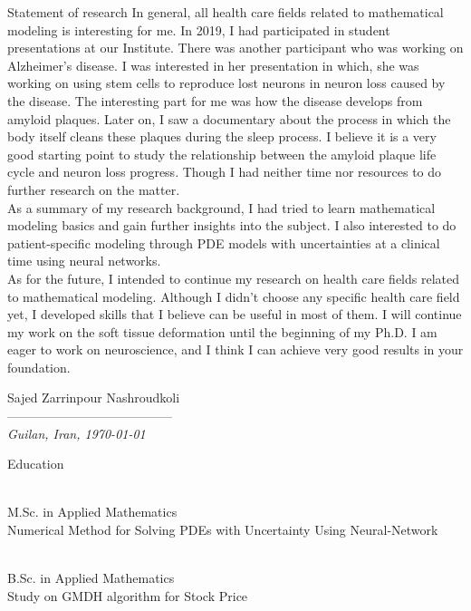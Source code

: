 \documentclass{resume} %
\begin{document}
\begin{cSection}{Statement of research}
	In general, all health care fields related to mathematical modeling is interesting for me. In 2019, I had participated in student presentations at our Institute. There was another participant who was working on Alzheimer's disease. I was interested in her presentation in which, she was working on using stem cells to reproduce lost neurons in neuron loss caused by the disease. The interesting part for me was how the disease develops from amyloid plaques. Later on, I saw a documentary about the process in which the body itself cleans these plaques during the sleep process. I believe it is a very good starting point to study the relationship between the amyloid plaque life cycle and neuron loss progress. Though I  had neither time nor resources to do further research on the matter.\\
	As a summary of my research background, I had tried to learn mathematical modeling basics and gain further insights into the subject. I also interested to do patient-specific modeling through PDE models with uncertainties at a clinical time using neural networks.\\
	As for the future, I intended to continue my research on health care fields related to mathematical modeling. Although I didn't choose any specific health care field yet, I developed skills that I believe can be useful in most of them. I will continue my work on the soft tissue deformation until the beginning of my Ph.D. I am eager to work on neuroscience, and I think I can achieve very good results in your foundation.\\	
	\vspace*{1em}
	
	Sajed Zarrinpour Nashroudkoli\\
	\normalsize
	---------------------------------------\\
	\tiny\textit{\scriptsize Guilan, Iran, \today}\normalsize
	
\end{cSection}


\begin{rSection}{Education}

	 \\%
	M.Sc. in Applied Mathematics \smallskip \\
	Numerical Method for Solving PDEs with Uncertainty Using Neural-Network 
	
	\\ %
	B.Sc. in Applied Mathematics \smallskip \\
	Study on GMDH algorithm for Stock Price
\end{rSection}
\end{document}
